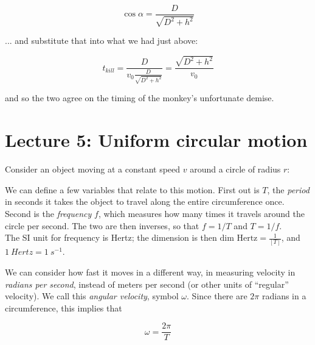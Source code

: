 \begin{equation}
\cos \alpha = \frac{D}{\sqrt{D^2 + h^2}}
\end{equation}

... and substitute that into what we had just above:

\begin{equation}
t_{kill} = \frac{D}{v_0 \frac{D}{\sqrt{D^2 + h^2}}} = \frac{\sqrt{D^2 + h^2}}{v_0} 
\end{equation}

and so the two agree on the timing of the monkey's unfortunate demise.

\newpage

\section{Lecture 5: Uniform circular motion}

Consider an object moving at a constant speed $v$ around a circle of radius $r$:

\begin{figure}[H]
  \centering
{}
\end{figure}

We can define a few variables that relate to this motion. First out is $T$, the \emph{period} in seconds it takes the object to travel along the entire circumference once. Second is the \emph{frequency} $f$, which measures how many times it travels around the circle per second. The two are then inverses, so that $f = 1/T$ and $T = 1/f$.\\
The SI unit for frequency is Hertz; the dimension is then $\text{dim Hertz} = \displaystyle \frac{1}{[T]}$, and $\SI{1}{Hertz} = \SI{1}{s^{-1}}$.

We can consider how fast it moves in a different way, in measuring velocity in \emph{radians per second}, instead of meters per second (or other units of ``regular'' velocity). We call this \emph{angular velocity}, symbol $\omega$. Since there are $2\pi$ radians in a circumference, this implies that

\begin{equation}
\omega = \frac{2 \pi}{T}
\end{equation}

